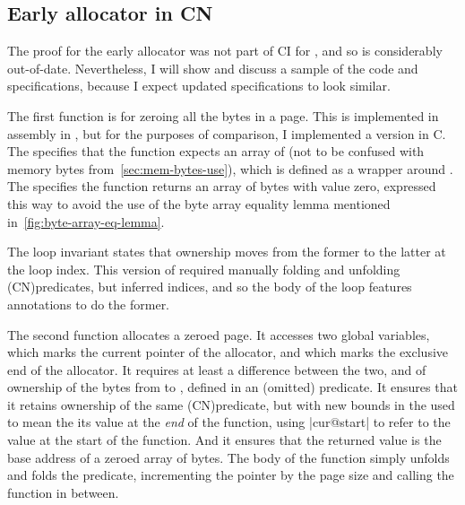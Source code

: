 \subsection{Early allocator in CN}

The proof for the early allocator was not part of CI for , and so is
considerably out-of-date. Nevertheless, I will show and discuss a sample of the
code and specifications, because I expect updated specifications to look
similar.

The first function is for zeroing all the bytes in a page. This is implemented
in assembly in , but for the purposes of comparison, I implemented a
version in C. The  specifies that the function expects an array of
 (not to be confused with memory bytes from~\cref{sec:mem-bytes-use}),
which is defined as a wrapper around
. The  specifies the function returns an
array of bytes with value zero, expressed this way to avoid the use of the byte
array equality lemma mentioned in~\cref{fig:byte-array-eq-lemma}.

The loop invariant states that ownership moves from the former to the latter at
the loop index. This version of  required manually folding and unfolding
\kl(CN){predicates}, but inferred indices, and so the body of the loop features
annotations to do the former.


The second function allocates a zeroed page. It accesses two global variables,
 which marks the current pointer of the allocator, and
 which marks the exclusive end of the allocator. It requires at
least a  difference between the two, and of ownership of the
bytes from  to , defined in an (omitted)
 predicate. It ensures that it retains ownership of the
same \kl(CN){predicate}, but with new bounds \textemdash{}  in the
 used to mean the its value at the \emph{end} of the
function, using \cninline|{cur}@start| to refer to the value at the start of
the function. And it ensures that the returned value is the base address of a
zeroed array of bytes. The body of the function simply unfolds and folds the
 predicate, incrementing the pointer by the page size and
calling the  function in between.

